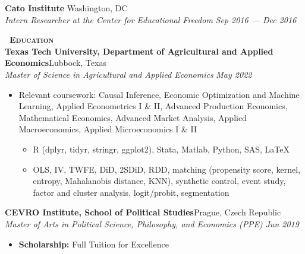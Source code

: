 \documentclass[a4paper,11pt]{article}
\newcommand{\header} [1] {
    \vspace{1mm}
    {\textsc{\textbf{\large{\xrfill[0.5ex]{0.5pt}~#1~\xrfill[0.5ex]{0.5pt}}}}} %
}
\begin{document}
\textbf{Cato Institute} \hfill Washington, DC\\
\textit{Intern Researcher at the Center for Educational Freedom} \hfill \textit{Sep 2016 --- Dec 2016}\\
\vspace{1mm}


\header{Education} \\
\vspace{1mm}
\textbf{Texas Tech University, Department of Agricultural and Applied Economics}\hfill Lubbock, Texas\\
\textit{Master of Science in Agricultural and Applied Economics} \hfill  \textit{May 2022} \\
\begin{itemize}
    \item Relevant coursework: Causal Inference, Economic Optimization and Machine Learning, Applied Econometrics I \& II, Advanced Production Economics, Mathematical Economics, Advanced Market Analysis, Applied Macroeconomics, Applied Microeconomics I \& II
    \begin{itemize}
        \item R (dplyr, tidyr, stringr, ggplot2), Stata, Matlab, Python, SAS, \LaTeX
        \item OLS, IV, TWFE, DiD, 2SDiD, RDD, matching (propensity score, kernel, entropy, Mahalanobis distance,  KNN), synthetic control, event study, factor and cluster analysis, logit/probit, segmentation
    \end{itemize}
\end{itemize}
\vspace{1mm}

\textbf{CEVRO Institute, School of Political Studies}\hfill Prague, Czech Republic\\
\textit{Master of Arts in Political Science, Philosophy, and Economics (PPE)} \hfill  \textit{Jun 2019}\\
\begin{itemize}
    \item \textbf{Scholarship:} Full Tuition for Excellence
\end{itemize}
\vspace{1mm}
\end{document}
